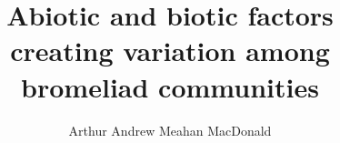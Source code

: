 \documentclass[
12pt         %
,oneside     %
,openright   %
]{mythesis}
\title{Abiotic and biotic factors\\%
  creating variation among\\bromeliad communities}
\author{Arthur Andrew Meahan MacDonald}
\begin{document}
\maketitle




\allcontents


\cleardoublepage
\mainbody





%


\formatbibliography



% 
\end{document}
